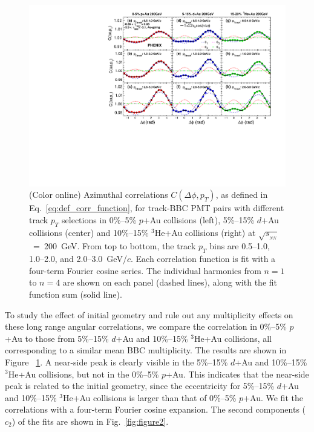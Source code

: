 \documentclass[%
reprint,
showpacs,preprintnumbers,
 amsmath,amssymb,
 aps,
]{revtex4-1}
\newcommand{\pt}{\mbox{$p_T$}\xspace}
\newcommand{\sqsn}{\mbox{$\sqrt{s_{_{NN}}}$}\xspace}
\newcommand{\dau}{\mbox{$d$+Au}\xspace}
\newcommand{\pau}{\mbox{$p$+Au}\xspace}
\newcommand{\hau}{\mbox{$^3\text{He}$+Au}\xspace}
\begin{document}
\begin{figure}[htbp]
  \includegraphics[scale=0.8]{Figures/figure1.pdf}
  \caption{(Color online) Azimuthal correlations $C(\Delta\phi,p_{T})$, as defined in
Eq.~\ref{eq:def_corr_function}, for track-BBC PMT pairs with different
track \pt selections in 0\%--5\% \pau collisions (left), 5\%--15\% \dau collisions (center) and
10\%--15\% \hau collisions (right) at \sqsn~=~200~GeV. From top to bottom,
the track \pt bins are 0.5--1.0, 1.0--2.0, and 2.0--3.0~GeV/$c$. Each
correlation function is fit with a four-term Fourier cosine series. The
individual harmonics from $n=1$ to $n=4$ are shown on each panel (dashed lines), along
with the fit function sum (solid line).}
\label{fig:figure1}
\end{figure}

To study the effect of initial geometry and rule out any multiplicity effects on these long range angular correlations, we compare the correlation in 0\%--5\% \pau to those from 5\%--15\% \dau and 10\%--15\% \hau collisions, all corresponding to a similar mean BBC multiplicity. The results are shown in Figure ~\ref{fig:figure1}. A near-side peak is clearly visible in the 5\%--15\% \dau and 10\%--15\% \hau collisions, but not in the 0\%--5\% \pau. This indicates that the near-side peak is related to the initial geometry, since the eccentricity for 5\%--15\% \dau and 10\%--15\% \hau collisions is larger than that of 0\%--5\% \pau. We fit the correlations with a four-term Fourier cosine expansion. The second components ($c_{2}$) of the fits are shown in Fig.~\ref{fig:figure2}.
\end{document}
